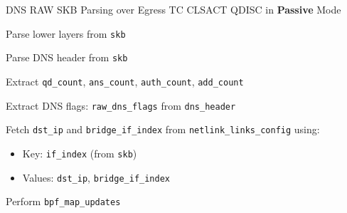 \documentclass [11pt, proquest] {uwthesis}[2020/02/24]
\begin{document}
\begin{algorithm}[H]
\caption{DNS RAW SKB Parsing over Egress TC CLSACT QDISC in \textbf{Passive} Mode}
\label{sec:alg4}

\small
{}


Parse lower layers from \texttt{skb}\;

Parse DNS header from \texttt{skb}\;

Extract \texttt{qd\_count}, \texttt{ans\_count}, \texttt{auth\_count}, \texttt{add\_count}\;


Extract DNS flags: \texttt{raw\_dns\_flags} from \texttt{dns\_header}\;



Fetch \texttt{dst\_ip} and \texttt{bridge\_if\_index} from \texttt{netlink\_links\_config} using:
\begin{itemize}[nosep]
  \item Key: \texttt{if\_index} (from \texttt{skb})
  \item Values: \texttt{dst\_ip}, \texttt{bridge\_if\_index}
\end{itemize}

Perform \texttt{bpf\_map\_updates}\;

\end{algorithm}
\end{document}
